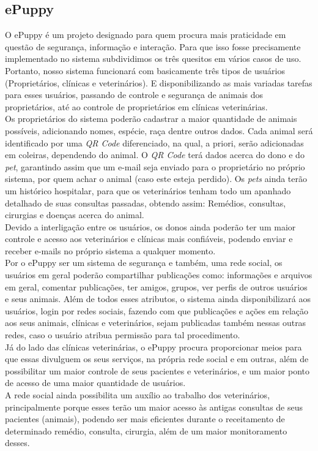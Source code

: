 \subsection{ePuppy}
O ePuppy é um projeto designado para quem procura mais praticidade em questão de segurança, informação e interação. Para que isso fosse precisamente implementado no sistema subdividimos os três quesitos em vários casos de uso.
\\
\indent
Portanto, nosso sistema funcionará com basicamente três tipos de usuários (Proprietários, clínicas e veterinários). E disponibilizando as mais variadas tarefas para esses usuários, passando de controle e segurança de animais dos proprietários, até ao controle de proprietários em clínicas veterinárias.
\\
\indent
Os proprietários do sistema poderão cadastrar a maior quantidade de animais possíveis, adicionando nomes, espécie, raça dentre outros dados. Cada animal será identificado por uma {\it QR Code} diferenciado, na qual, a priori, serão adicionadas em coleiras, dependendo do animal. O {\it QR Code} terá dados acerca do dono e do {\it pet}, garantindo assim que um e-mail seja enviado para o proprietário no próprio sistema, por quem achar o animal (caso este esteja perdido). Os {\it pets} ainda terão um histórico hospitalar, para que os veterinários tenham todo um apanhado detalhado de suas consultas passadas, obtendo assim: Remédios, consultas, cirurgias e doenças acerca do animal.
\\
\indent
Devido a interligação entre os usuários, os donos ainda poderão ter um maior controle e acesso aos veterinários e clínicas mais confiáveis, podendo enviar e receber e-mails no próprio sistema a qualquer momento.
\\
\indent
Por o ePuppy ser um sistema de segurança e também, uma rede social, os usuários em geral poderão compartilhar publicações como: informações e arquivos em geral, comentar publicações, ter amigos, grupos, ver perfis de outros usuários e seus animais. Além de todos esses atributos, o sistema ainda disponibilizará aos usuários, login por redes sociais, fazendo com que publicações e ações em relação aos seus animais, clínicas e veterinários, sejam publicadas também nessas outras redes, caso o usuário atribua permissão para tal procedimento.
\\
\indent
Já do lado das clínicas veterinárias, o ePuppy procura proporcionar meios para que essas divulguem os seus serviços, na própria rede social e em outras, além de possibilitar um maior controle de seus pacientes e veterinários, e um maior ponto de acesso de uma maior quantidade de usuários.
\\
\indent
A rede social ainda possibilita um auxílio ao trabalho dos veterinários, principalmente porque esses terão um maior acesso às antigas consultas de seus pacientes (animais), podendo ser mais eficientes durante o receitamento de determinado remédio, consulta, cirurgia, além de um maior monitoramento desses.

